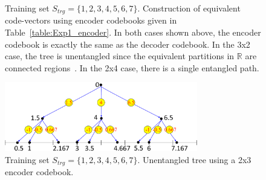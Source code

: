 							\begin{figure}[t]
							\centering
							\caption{Training set $S_{trg}=\{1,2,3,4,5,6,7\}$.  Construction of equivalent code-vectors using encoder codebooks given in Table~\ref{table:Exp1_encoder}.  In both cases shown above, the encoder codebook is exactly the same as the decoder codebook.  In the 3x2 case, the tree is unentangled since the equivalent partitions in $\mathbb{R}$ are connected regions~\cite{1992_JNL_RVQ_Barnes}.  In the 2x4 case, there is a single entangled path.}
							\label{fig:RVQ_entanglement_tree}
							\end{figure}

							\begin{figure}[t]
							\centering
							\includegraphics[width=0.75\textwidth]{thesis2/RVQ_trg_1_to_7_equivalentCVs_3.pdf}
							\caption{Training set $S_{trg}=\{1,2,3,4,5,6,7\}$.  Unentangled tree using a 2x3 encoder codebook.}
							\label{fig:RVQ_unentanglement_tree}
							\end{figure}

